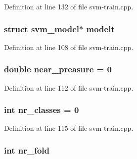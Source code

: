 Definition at line 132 of file svm-\/train.\-cpp.

\hypertarget{svm-train_8cpp_a0b730cfd99e9c8a2ece39a165ebcc5ef}{
\subsubsection[{modelt}]{\setlength{\rightskip}{0pt plus 5cm}struct {\bf svm\-\_\-model}$\ast$ modelt}}\label{svm-train_8cpp_a0b730cfd99e9c8a2ece39a165ebcc5ef}


Definition at line 108 of file svm-\/train.\-cpp.

\hypertarget{svm-train_8cpp_ab569b65ce2e86831530c897a3ad5c901}{
\subsubsection[{near\-\_\-preasure}]{\setlength{\rightskip}{0pt plus 5cm}double near\-\_\-preasure = 0}}\label{svm-train_8cpp_ab569b65ce2e86831530c897a3ad5c901}


Definition at line 112 of file svm-\/train.\-cpp.

\hypertarget{svm-train_8cpp_ad88594354ad0cd1b5f3cebf37f8381cf}{
\subsubsection[{nr\-\_\-classes}]{\setlength{\rightskip}{0pt plus 5cm}int nr\-\_\-classes = 0}}\label{svm-train_8cpp_ad88594354ad0cd1b5f3cebf37f8381cf}


Definition at line 115 of file svm-\/train.\-cpp.

\hypertarget{svm-train_8cpp_a8e8ea59d1060e411ced9b25867c66651}{
\subsubsection[{nr\-\_\-fold}]{\setlength{\rightskip}{0pt plus 5cm}int nr\-\_\-fold}}\label{svm-train_8cpp_a8e8ea59d1060e411ced9b25867c66651}


